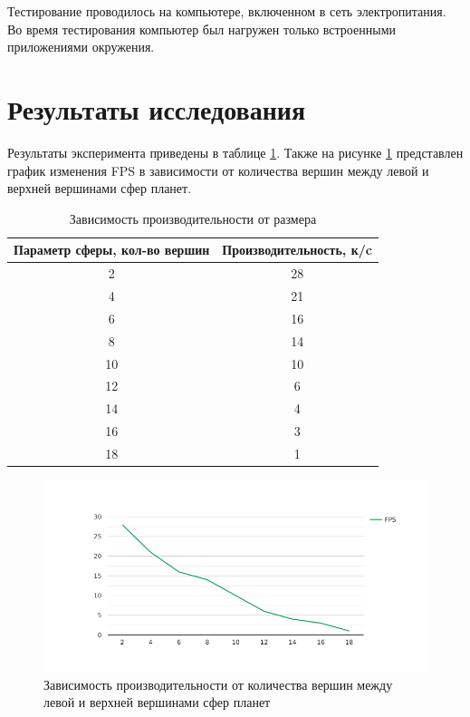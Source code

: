Тестирование проводилось на компьютере, включенном в сеть электропитания. Во время тестирования компьютер был нагружен только встроенными приложениями окружения.

\clearpage


\section{Результаты исследования}

Результаты эксперимента приведены в таблице \ref{tbl:time}. Также на рисунке \ref{img:graph} представлен график изменения FPS в зависимости от количества вершин между левой и верхней вершинами сфер планет.

\begin{table}[h]
	\begin{center}
		\begin{threeparttable}
			\captionsetup{justification=raggedright,singlelinecheck=off}
			\caption{Зависимость производительности от размера}
			\label{tbl:time}
			\begin{tabular}{|c|c|}
				\hline
				Параметр сферы, кол-во вершин & Производительность, к/c   \\
				\hline
				2 & 28 \\ 
				4 & 21 \\ 
				6 & 16 \\ 
				8 & 14 \\ 
				10 & 10 \\ 
				12 & 6 \\ 
				14 & 4 \\ 
				16 & 3 \\ 
				18 & 1 \\ 
				\hline
			\end{tabular}
		\end{threeparttable}
	\end{center}
\end{table}


\begin{figure}[H]
	\begin{center}
		\includegraphics[scale=0.8]{img/researchlines.png}
	\end{center}
	\captionsetup{justification=centering}
	\caption{Зависимость производительности от количества вершин между левой и верхней вершинами сфер планет}
	\label{img:graph}
\end{figure}

